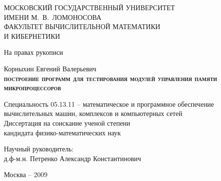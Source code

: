 \documentclass[14pt]{extreport}
\begin{document}
\thispagestyle{empty}

\begin{singlespace}
\begin{center}
%
МОСКОВСКИЙ ГОСУДАРСТВЕННЫЙ УНИВЕРСИТЕТ\\ ИМЕНИ М.~В.~ЛОМОНОСОВА\\[0.5cm]

ФАКУЛЬТЕТ ВЫЧИСЛИТЕЛЬНОЙ МАТЕМАТИКИ\\ И КИБЕРНЕТИКИ\\[1cm]
\end{center}

\begin{flushright}
На правах рукописи\\[2cm]
\end{flushright}

\begin{center}
Корныхин Евгений Валерьевич\\[1cm]
\textbf{%
\huge{%
\textsc{построение программ
для тестирования
модулей управления памяти микропроцессоров}}\\[0.5cm]}

Специальность 05.13.11 -- математическое и программное обеспечение
вычислительных машин, комплексов и компьютерных сетей\\[1.5cm]


Диссертация на соискание ученой степени\\
кандидата физико-математических наук
\end{center}

\vspace{0.7cm}

\begin{flushright} Научный руководитель:\\
д.ф-м.н. Петренко Александр Константинович
\end{flushright}

\vspace{1.5cm}

\begin{center}
Москва -- 2009
\end{center}


\end{singlespace}
\end{document}
